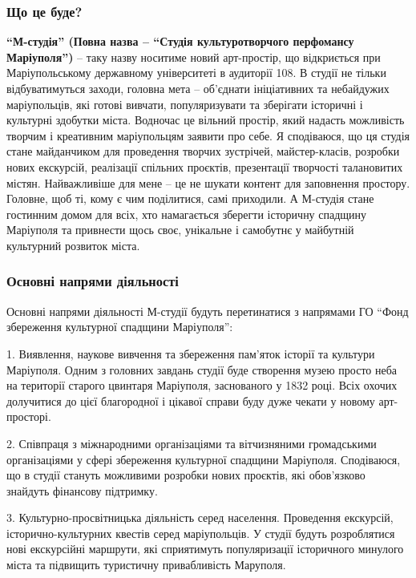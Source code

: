 \subsubsection{Що це буде?}

\textbf{\enquote{М-студія} (Повна назва – \enquote{Студія культуротворчого перфомансу Маріуполя})} –
таку назву носитиме новий арт-простір, що відкриється при Маріупольському
державному університеті в аудиторії 108. В студії не тільки відбуватимуться
заходи, головна мета – об'єднати ініціативних та небайдужих маріупольців, які
готові вивчати, популяризувати та зберігати історичні і культурні здобутки
міста. Водночас це вільний простір, який надасть можливість творчим і
креативним маріупольцям заявити про себе. Я сподіваюся, що ця студія стане
майданчиком для проведення творчих зустрічей, майстер-класів, розробки нових
екскурсій, реалізації спільних проєктів, презентації творчості талановитих
містян. Найважливіше для мене – це не шукати контент для заповнення простору.
Головне, щоб ті, кому є чим поділитися, самі приходили. А М-студія стане
гостинним домом для всіх, хто намагається зберегти історичну спадщину Маріуполя
та привнести щось своє, унікальне і самобутнє у майбутній культурний розвиток
міста.


\subsubsection{Основні напрями діяльності}

Основні напрями діяльності М-студії будуть перетинатися з напрямами ГО
\enquote{Фонд збереження культурної спадщини Маріуполя}:

1. Виявлення, наукове вивчення та збереження пам'яток історії та культури
Маріуполя. Одним з головних завдань студії буде створення музею просто неба на
території старого цвинтаря Маріуполя, заснованого у 1832 році. Всіх охочих
долучитися до цієї благородної і цікавої справи буду дуже чекати у новому
арт-просторі.

2. Співпраця з міжнародними організаціями та вітчизняними громадськими
організаціями у сфері збереження культурної спадщини Маріуполя. Сподіваюся, що
в студії стануть можливими розробки нових проєктів, які обов'язково знайдуть
фінансову підтримку.

3. Культурно-просвітницька діяльність серед населення. Проведення екскурсій,
історично-культурних квестів серед маріупольців. У студії будуть розроблятися
нові екскурсійні маршрути, які сприятимуть популяризації історичного минулого
міста та підвищить туристичну привабливість Маруполя.

